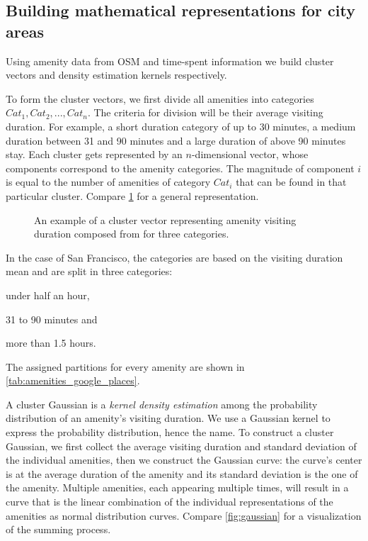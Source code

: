 \documentclass{ws-ijait}
\begin{document}
	\subsection{Building mathematical representations for city areas}
	Using amenity data from OSM and time-spent information we build cluster vectors and density estimation kernels respectively.
	
	To form the cluster vectors, we first divide all amenities into categories $Cat_1, Cat_2, ..., Cat_n$. The criteria for division will be their average visiting duration. For example, a short duration category of up to 30 minutes, a medium duration between 31 and 90 minutes and a large duration of above 90 minutes stay. Each cluster gets represented by an $n$-dimensional vector, whose components correspond to the amenity categories. The magnitude of component $i$ is equal to the number of amenities of category $Cat_i$ that can be found in that particular cluster. Compare \cref{fig:cluster_vector} for a general representation.
	
	\begin{figure}[!ht]
		\centering
		
		\caption{An example of a cluster vector representing amenity visiting duration composed from for three categories.}
		\label{fig:cluster_vector}
	\end{figure}
	
	In the case of San Francisco, the categories are based on the visiting duration mean and are split in three categories: 
	\begin{romanlist}
		\item under half an hour,
		\item 31 to 90 minutes and
		\item more than 1.5 hours. 
	\end{romanlist}
	The assigned partitions for every amenity are shown in \cref{tab:amenities_google_places}.
	
	A cluster Gaussian is a \textit{kernel density estimation} among the probability distribution of an amenity's visiting duration. We use a Gaussian kernel to express the probability distribution, hence the name. To construct a cluster Gaussian, we first collect the average visiting duration and standard deviation of the individual amenities, then we construct the Gaussian curve: the curve's center is at the average duration of the amenity and its standard deviation is the one of the amenity. Multiple amenities, each appearing multiple times, will result in a curve that is the linear combination of the individual representations of the amenities as normal distribution curves. Compare \cref{fig:gaussian} for a visualization of the summing process.
	
\end{document}
